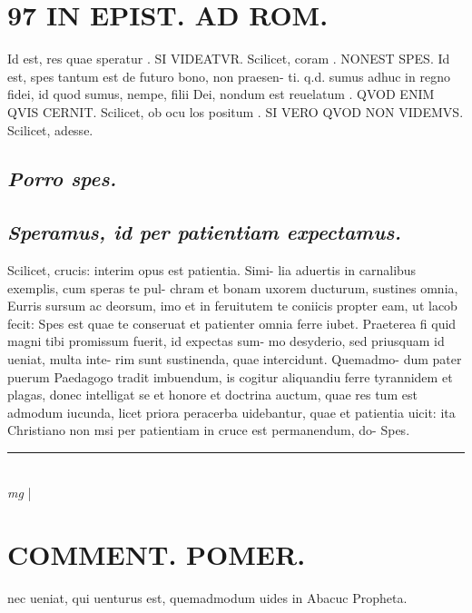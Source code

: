 \documentclass{article}
\begin{document}
\begin{pages}
\section*{97 IN EPIST. AD ROM.  }
\marginpar{[ p.]}\pstart Id est, res quae speratur . SI VIDEATVR.  Scilicet, coram . NONEST SPES. Id est, spes tantum est de futuro bono, non praesen- ti. q.d. sumus adhuc in regno fidei, id quod sumus, nempe, filii Dei, nondum est reuelatum . QVOD ENIM QVIS CERNIT. Scilicet, ob ocu los positum . SI VERO QVOD NON VIDEMVS. Scilicet, adesse.   \pend
{}
{}
\subsection*{\textit{Porro spes. }}
{}
\subsection*{\textit{Speramus, id per patientiam expectamus. }}\pstart Scilicet, crucis: interim opus est patientia. Simi- lia aduertis in carnalibus exemplis, cum speras te pul- chram et bonam uxorem ducturum, sustines omnia, Eurris sursum ac deorsum, imo et in feruitutem te coniicis propter eam, ut lacob fecit: Spes est quae te conseruat et patienter omnia ferre iubet. Praeterea fi quid magni tibi promissum fuerit, id expectas sum- mo desyderio, sed priusquam id ueniat, multa inte- rim sunt sustinenda, quae intercidunt. Quemadmo- dum pater puerum Paedagogo tradit imbuendum, is cogitur aliquandiu ferre tyrannidem et plagas, donec intelligat se et honore et doctrina auctum, quae res tum est admodum iucunda, licet priora peracerba uidebantur, quae et patientia uicit: ita Christiano non msi per patientiam in cruce est permanendum, do- Spes.   \pend
\vspace{0.5cm}\noindent
\vspace{0.2cm}\rule{1cm}{0.2pt}\\ 
\hspace{0.2cm}\textit{mg}
\footnotesize 
\normalsize| 
\section*{COMMENT. POMER.  }\pstart nec ueniat, qui uenturus est, quemadmodum uides in Abacuc Propheta.   \pend
{}
{}

\end{pages}
\end{document}
